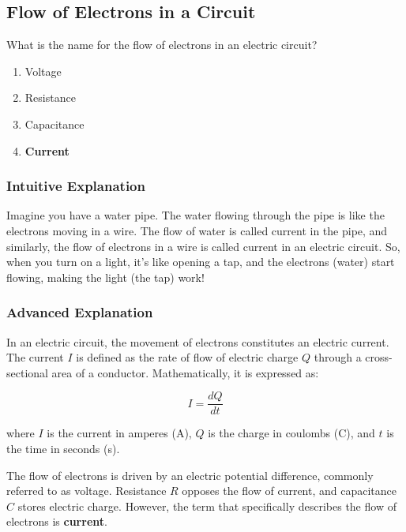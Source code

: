 \subsection{Flow of Electrons in a Circuit}
\label{T5A03}

\begin{tcolorbox}[colback=gray!10!white,colframe=black!75!black,title=T5A03]
What is the name for the flow of electrons in an electric circuit?
\begin{enumerate}[label=\Alph*)]
    \item Voltage
    \item Resistance
    \item Capacitance
    \item \textbf{Current}
\end{enumerate}
\end{tcolorbox}

\subsubsection{Intuitive Explanation}
Imagine you have a water pipe. The water flowing through the pipe is like the electrons moving in a wire. The flow of water is called current in the pipe, and similarly, the flow of electrons in a wire is called current in an electric circuit. So, when you turn on a light, it's like opening a tap, and the electrons (water) start flowing, making the light (the tap) work!

\subsubsection{Advanced Explanation}
In an electric circuit, the movement of electrons constitutes an electric current. The current \( I \) is defined as the rate of flow of electric charge \( Q \) through a cross-sectional area of a conductor. Mathematically, it is expressed as:

\[
I = \frac{dQ}{dt}
\]

where \( I \) is the current in amperes (A), \( Q \) is the charge in coulombs (C), and \( t \) is the time in seconds (s). 

The flow of electrons is driven by an electric potential difference, commonly referred to as voltage. Resistance \( R \) opposes the flow of current, and capacitance \( C \) stores electric charge. However, the term that specifically describes the flow of electrons is \textbf{current}.

